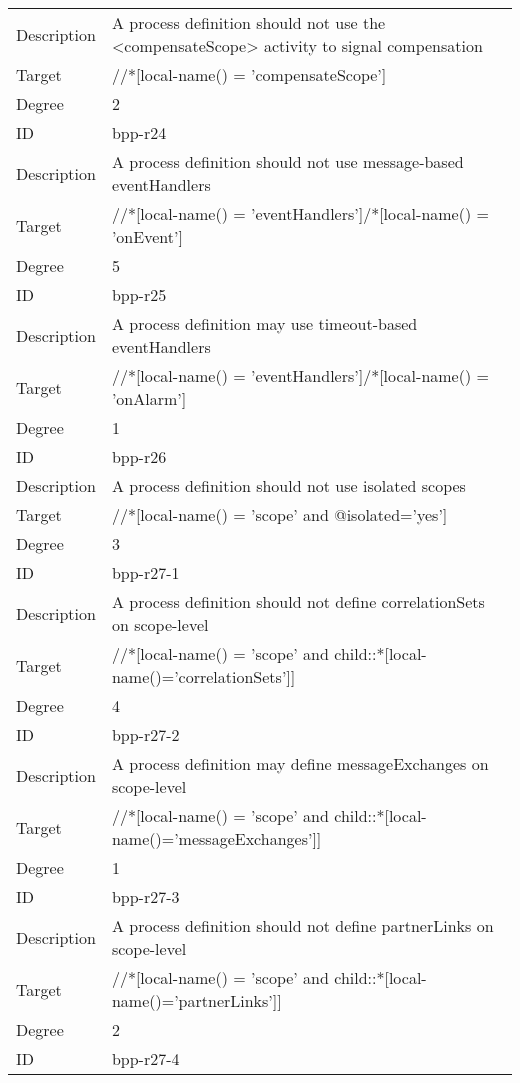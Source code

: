 \begin{center}
\begin{tiny}
\begin{longtable}{p{}|p{}}
\myrowcolour
Description &A process definition should not use the <compensateScope> activity to signal compensation\\
Target & //*[local-name() = 'compensateScope']\\
\myrowcolour
Degree & 2\\
\midrule
ID & bpp-r24\\
\myrowcolour
Description &A process definition should not use message-based eventHandlers\\
Target & //*[local-name() = 'eventHandlers']/*[local-name() = 'onEvent']\\
\myrowcolour
Degree & 5\\
\midrule
ID & bpp-r25\\
\myrowcolour
Description &A process definition may use timeout-based eventHandlers\\
Target & //*[local-name() = 'eventHandlers']/*[local-name() = 'onAlarm']\\
\myrowcolour
Degree & 1\\
\midrule
ID & bpp-r26\\
\myrowcolour
Description &A process definition should not use isolated scopes\\
Target & //*[local-name() = 'scope' and @isolated='yes']\\
\myrowcolour
Degree & 3\\
\midrule
ID & bpp-r27-1\\
\myrowcolour
Description &A process definition should not define correlationSets on scope-level\\
Target & //*[local-name() = 'scope' and child::*[local-name()='correlationSets']]\\
\myrowcolour
Degree & 4\\
\midrule
ID & bpp-r27-2\\
\myrowcolour
Description &A process definition may define messageExchanges on scope-level\\
Target & //*[local-name() = 'scope' and child::*[local-name()='messageExchanges']]\\
\myrowcolour
Degree & 1\\
\midrule
ID & bpp-r27-3\\
\myrowcolour
Description &A process definition should not define partnerLinks on scope-level\\
Target & //*[local-name() = 'scope' and child::*[local-name()='partnerLinks']]\\
\myrowcolour
Degree & 2\\
\midrule
ID & bpp-r27-4\\

\end{longtable}
\end{tiny}
\end{center}
